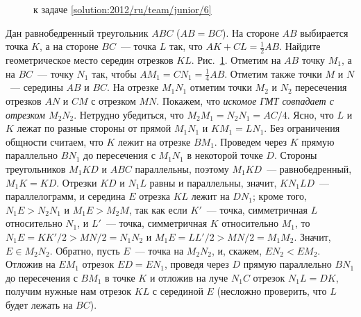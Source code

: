 \ifsolution
\begin{figure}\centering
    \caption{к задаче \ref{solution:2012/ru/team/junior/6}}
    \label{fig:solution:2012/ru/team/junior/6}
\end{figure}
\fi %

\problem{}
Дан равнобедренный треугольник $ABC$ ($AB = BC$).
На стороне $AB$ выбирается точка $K$, а на стороне $BC$~--- точка $L$ так, что
$AK + CL = \frac{1}{2} AB$.
Найдите геометрическое место середин отрезков $KL$.
\solution
\label{solution:2012/ru/team/junior/6}
Рис.~\ref{fig:solution:2012/ru/team/junior/6}.
Отметим на $AB$ точку $M_1$, а на $BC$~--- точку $N_1$ так, чтобы
$A M_1 = C N_1 = \frac{1}{4} AB$.
Отметим также точки $M$ и $N$~--- середины $AB$ и $BC$.
На отрезке $M_1 N_1$ отметим точки $M_2$ и $N_2$ пересечения отрезков
$A N$ и $C M$ с отрезком $MN$.
Покажем, что \emph{искомое ГМТ совпадает с отрезком $M_2 N_2$}.
Нетрудно убедиться, что $M_2 M_1 = N_2 N_1 = AC / 4$.
Ясно, что $L$ и $K$ лежат по разные стороны от прямой $M_1 N_1$ и
$K M_1 = L N_1$.
Без ограничения общности считаем, что $K$ лежит на отрезке $B M_1$.
Проведем через $K$ прямую параллельно $B N_1$ до пересечения с $M_1 N_1$ в
некоторой точке $D$.
Стороны треугольников $M_1 K D$ и $ABC$ параллельны, поэтому $M_1 K D$~---
равнобедренный, $M_1 K = KD$.
Отрезки $KD$ и $N_1 L$ равны и параллельны, значит, $K N_1 L D$~---
параллелограмм, и середина $E$ отрезка $KL$ лежит на $D N_1$;
кроме того, $N_1 E > N_2 N_1$ и $M_1 E > M_2 M$, так как если
$K'$~--- точка, симметричная $L$ относительно $N_1$, и
$L'$~--- точка, симметричная $K$ относительно $M_1$, то
$N_1 E = K K' / 2 > MN / 2 = N_1 N_2$ и $M_1 E = L L' / 2 > M N / 2 = M_1 M_2$.
Значит, $E \in M_2 N_2$.
Обратно, пусть $E$~--- точка на $M_2 N_2$, и, скажем, $E N_2 < E M_2$.
Отложив на $E M_1$ отрезок $ED = E N_1$, проведя через $D$ прямую параллельно
$B N_1$ до пересечения с $B M_1$ в точке $K$ и отложив на луче $N_1 C$ отрезок
$N_1 L = DK$, получим нужные нам отрезок $KL$ с серединой $E$
(несложно проверить, что $L$ будет лежать на $BC$).
\endproblem
